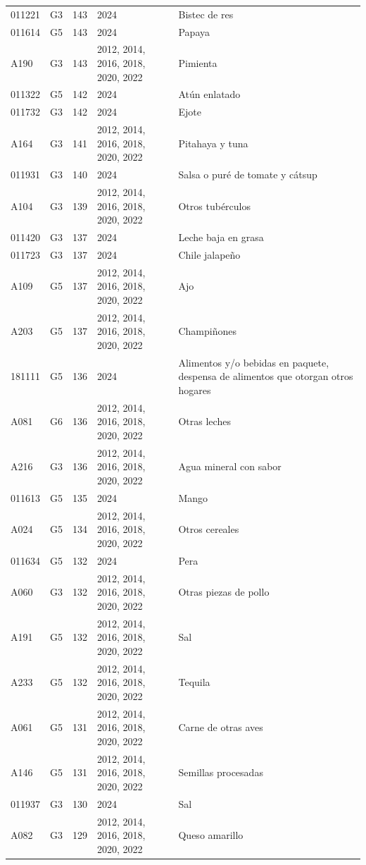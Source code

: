\begin{table}[ht]
\begin{tabular}{llrll}
  011221 & G3 & 143 & 2024 & Bistec de res \\ 
  011614 & G5 & 143 & 2024 & Papaya \\ 
  A190 & G3 & 143 & 2012, 2014, 2016, 2018, 2020, 2022 & Pimienta \\ 
  011322 & G5 & 142 & 2024 & Atún enlatado \\ 
  011732 & G3 & 142 & 2024 & Ejote \\ 
  A164 & G3 & 141 & 2012, 2014, 2016, 2018, 2020, 2022 & Pitahaya y tuna \\ 
  011931 & G3 & 140 & 2024 & Salsa o puré de tomate y cátsup \\ 
  A104 & G3 & 139 & 2012, 2014, 2016, 2018, 2020, 2022 & Otros tubérculos \\ 
  011420 & G3 & 137 & 2024 & Leche baja en grasa \\ 
  011723 & G3 & 137 & 2024 & Chile jalapeño \\ 
  A109 & G5 & 137 & 2012, 2014, 2016, 2018, 2020, 2022 & Ajo \\ 
  A203 & G5 & 137 & 2012, 2014, 2016, 2018, 2020, 2022 & Champiñones \\ 
  181111 & G5 & 136 & 2024 & Alimentos y/o bebidas en paquete, despensa de alimentos que otorgan otros hogares \\ 
  A081 & G6 & 136 & 2012, 2014, 2016, 2018, 2020, 2022 & Otras leches \\ 
  A216 & G3 & 136 & 2012, 2014, 2016, 2018, 2020, 2022 & Agua mineral con sabor \\ 
  011613 & G5 & 135 & 2024 & Mango \\ 
  A024 & G5 & 134 & 2012, 2014, 2016, 2018, 2020, 2022 & Otros cereales \\ 
  011634 & G5 & 132 & 2024 & Pera \\ 
  A060 & G3 & 132 & 2012, 2014, 2016, 2018, 2020, 2022 & Otras piezas de pollo \\ 
  A191 & G5 & 132 & 2012, 2014, 2016, 2018, 2020, 2022 & Sal \\ 
  A233 & G5 & 132 & 2012, 2014, 2016, 2018, 2020, 2022 & Tequila \\ 
  A061 & G5 & 131 & 2012, 2014, 2016, 2018, 2020, 2022 & Carne de otras aves \\ 
  A146 & G5 & 131 & 2012, 2014, 2016, 2018, 2020, 2022 & Semillas procesadas \\ 
  011937 & G3 & 130 & 2024 & Sal \\ 
  A082 & G3 & 129 & 2012, 2014, 2016, 2018, 2020, 2022 & Queso amarillo \\ 

\end{tabular}
\end{table}
